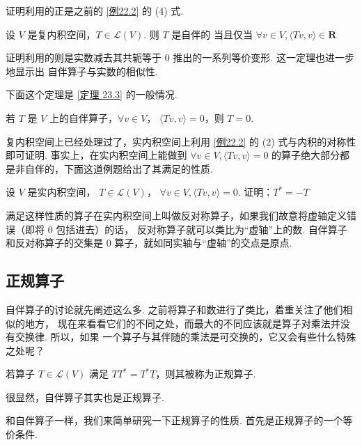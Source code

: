 证明利用的正是之前的 \ref{例22.2} 的 (4) 式. 

\begin{theorem}
    设 $ V $ 是复内积空间，$ T \in \mathcal{L}(V) $. 则 $ T $ 是自伴的
    当且仅当 $ \forall v \in V, \langle Tv, v \rangle \in \mathbf{R} $
\end{theorem}

证明利用的则是实数减去其共轭等于 0 推出的一系列等价变形. 这一定理也进一步地显示出
自伴算子与实数的相似性. 

下面这个定理是 \ref{定理 23.3} 的一般情况. 

\begin{theorem}
    若 $ T $ 是 $ V $ 上的自伴算子，$ \forall v \in V $，
    $ \langle Tv, v \rangle = 0 $，则 $ T = 0 $. 
\end{theorem}

复内积空间上已经处理过了，实内积空间上利用 \ref{例22.2} 的 (2) 式与内积的对称性即可证明.  
事实上，在实内积空间上能做到 $ \forall v \in V , \langle Tv, v \rangle = 0 $ 
的算子绝大部分都是非自伴的，下面这道例题给出了其满足的性质. 

\begin{example}
    设 $ V $ 是实内积空间， $ T \in \mathcal{L}(V) $，
    $ \forall v \in V, \langle Tv, v \rangle = 0 $.
    证明：$ T^* = -T $
\end{example}
   
满足这样性质的算子在实内积空间上叫做反对称算子，如果我们故意将虚轴定义错误（即将 0 包括进去）的话，
反对称算子就可以类比为“虚轴”上的数. 自伴算子和反对称算子的交集是 0 算子，就如同实轴与“虚轴”的交点是原点. 

\subsection{正规算子}

自伴算子的讨论就先阐述这么多. 之前将算子和数进行了类比，着重关注了他们相似的地方，
现在来看看它们的不同之处，而最大的不同应该就是算子对乘法并没有交换律. 所以，如果
一个算子与其伴随的乘法是可交换的，它又会有些什么特殊之处呢？

\begin{definition} 
    若算子 $ T \in \mathcal{L}(V) $ 满足 $ TT^* = T^*T $，则其被称为正规算子. 
\end{definition}

很显然，自伴算子其实也是正规算子. 

和自伴算子一样，我们来简单研究一下正规算子的性质. 首先是正规算子的一个等价条件.

